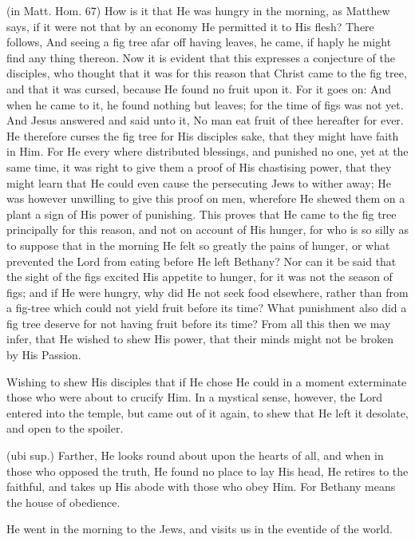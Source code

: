  (in Matt. Hom. 67) How is it that He was hungry in the morning, as Matthew says, if it were not that by an economy He permitted it to His flesh? There follows, And seeing a fig tree afar off having leaves, he came, if haply he might find any thing thereon. Now it is evident that this expresses a conjecture of the disciples, who thought that it was for this reason that Christ came to the fig tree, and that it was cursed, because He found no fruit upon it. For it goes on: And when he came to it, he found nothing but leaves; for the time of figs was not yet. And Jesus answered and said unto it, No man eat fruit of thee hereafter for ever. He therefore curses the fig tree for His disciples sake, that they might have faith in Him. For He every where distributed blessings, and punished no one, yet at the same time, it was right to give them a proof of His chastising power, that they might learn that He could even cause the persecuting Jews to wither away; He was however unwilling to give this proof on men, wherefore He shewed them on a plant a sign of His power of punishing. This proves that He came to the fig tree principally for this reason, and not on account of His hunger, for who is so silly as to suppose that in the morning He felt so greatly the pains of hunger, or what prevented the Lord from eating before He left Bethany? Nor can it be said that the sight of the figs excited His appetite to hunger, for it was not the season of figs; and if He were hungry, why did He not seek food elsewhere, rather than from a fig-tree which could not yield fruit before its time? What punishment also did a fig tree deserve for not having fruit before its time? From all this then we may infer, that He wished to shew His power, that their minds might not be broken by His Passion.

 Wishing to shew His disciples that if He chose He could in a moment exterminate those who were about to crucify Him. In a mystical sense, however, the Lord entered into the temple, but came out of it again, to shew that He left it desolate, and open to the spoiler.

 (ubi sup.) Farther, He looks round about upon the hearts of all, and when in those who opposed the truth, He found no place to lay His head, He retires to the faithful, and takes up His abode with those who obey Him. For Bethany means the house of obedience.

 He went in the morning to the Jews, and visits us in the eventide of the world.

